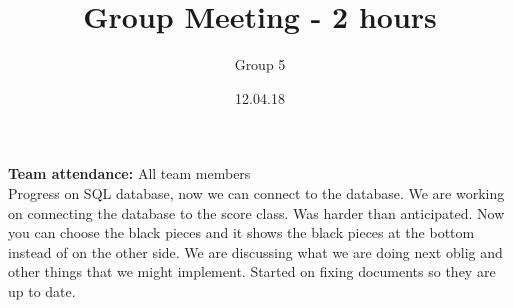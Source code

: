 \documentclass{article}
\title{Group Meeting - 2 hours}
\author{Group 5}
\date{12.04.18}
\begin{document}
	\maketitle
	\noindent
	\textbf{Team attendance:} All team members \\

	\noindent
	Progress on SQL database, now we can connect to the database. We are working on connecting the database to the
	score class. Was harder than anticipated. Now you can choose the black pieces and it shows the black pieces at the bottom
	instead of on the other side. We are discussing what we are doing next oblig and other things that we might implement.
	Started on fixing documents so they are up to date.
\end{document}
